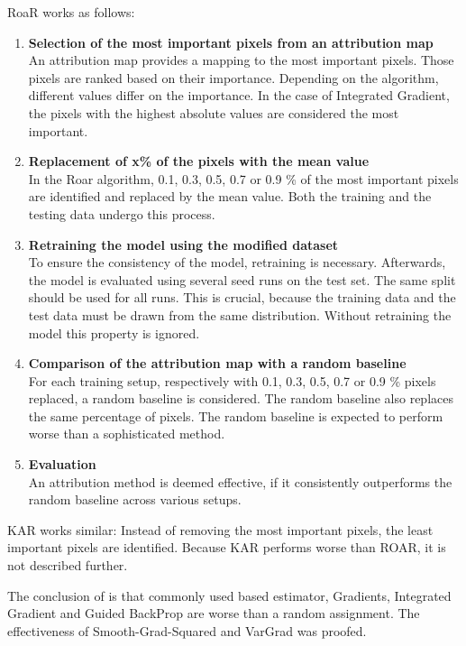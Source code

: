 RoaR  works as follows:
\begin{enumerate}
	\item \textbf{ Selection of the most important pixels from an attribution map}\\
	An attribution map provides a mapping to the most important pixels. Those pixels are ranked based on their importance. Depending on the algorithm, different values differ on the importance. In the case of Integrated Gradient, the pixels with the highest absolute values are considered the most important.
	\item \textbf{ Replacement of x\% of the pixels with the mean value}\\
	In the Roar algorithm, 0.1, 0.3, 0.5, 0.7 or 0.9 \% of the most important pixels are identified and replaced by the mean value. Both the training and the testing data undergo this process.
	\item \textbf{ Retraining the model using the modified dataset}\\
	To ensure the consistency of the model, retraining is necessary. Afterwards, the model is evaluated using several seed runs on the test set. The same split should be used for all runs.
	This is crucial, because the training data and the test data must be drawn from the same distribution. Without retraining the model this property is ignored.
	\item \textbf{ Comparison of the attribution map with a random baseline} \\
	For each training setup, respectively with 0.1, 0.3, 0.5, 0.7 or 0.9 \% pixels replaced, a random baseline is considered. The random baseline also replaces the same percentage of pixels. The random baseline is expected to perform worse than a sophisticated method.
	\item \textbf{ Evaluation} \\
	An attribution method is deemed effective, if it consistently outperforms the random baseline across various setups.
\end{enumerate}

KAR works similar: Instead of removing the most important pixels, the least important pixels are identified. Because KAR performs worse than ROAR, it is not described further.

The conclusion of \cite{hooker2019benchmark} is that commonly used based estimator, Gradients, Integrated Gradient and Guided BackProp are worse than a random assignment. The effectiveness of Smooth-Grad-Squared and VarGrad was proofed. 


